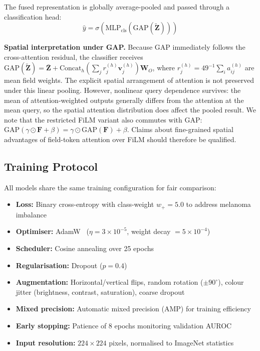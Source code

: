 \documentclass[12pt, a4paper]{article}
\newcommand{\sigmoid}{\sigma}
\begin{document}
The fused representation is globally average-pooled and passed through a classification head:
\begin{equation}
    \hat{y} = \sigmoid\!\left(\text{MLP}_{\text{cls}}\!\left(\text{GAP}(\tilde{\mathbf{Z}})\right)\right)
\end{equation}

\noindent\textbf{Spatial interpretation under GAP.} Because GAP immediately follows the cross-attention residual, the classifier receives $\text{GAP}(\tilde{\mathbf{Z}}) = \bar{\mathbf{Z}} + \text{Concat}_h(\sum_j r_j^{(h)} \mathbf{v}_j^{(h)}) \mathbf{W}_O$, where $r_j^{(h)} = 49^{-1}\sum_i a_{ij}^{(h)}$ are mean field weights. The explicit spatial arrangement of attention is not preserved under this linear pooling. However, nonlinear query dependence survives: the mean of attention-weighted outputs generally differs from the attention at the mean query, so the spatial attention distribution does affect the pooled result. We note that the restricted FiLM variant also commutes with GAP: $\text{GAP}(\gamma \odot \mathbf{F} + \beta) = \gamma \odot \text{GAP}(\mathbf{F}) + \beta$. Claims about fine-grained spatial advantages of field-token attention over FiLM should therefore be qualified.

\subsection{Training Protocol}

All models share the same training configuration for fair comparison:
\begin{itemize}
    \item \textbf{Loss:} Binary cross-entropy with class-weight $w_+ = 5.0$ to address melanoma imbalance
    \item \textbf{Optimiser:} AdamW~\citep{loshchilov2019decoupled} ($\eta = 3 \times 10^{-5}$, weight decay $= 5 \times 10^{-4}$)
    \item \textbf{Scheduler:} Cosine annealing over 25 epochs
    \item \textbf{Regularisation:} Dropout ($p = 0.4$)
    \item \textbf{Augmentation:} Horizontal/vertical flips, random rotation ($\pm 90^\circ$), colour jitter (brightness, contrast, saturation), coarse dropout
    \item \textbf{Mixed precision:} Automatic mixed precision (AMP) for training efficiency
    \item \textbf{Early stopping:} Patience of 8 epochs monitoring validation AUROC
    \item \textbf{Input resolution:} $224 \times 224$ pixels, normalised to ImageNet statistics
\end{itemize}
\end{document}
